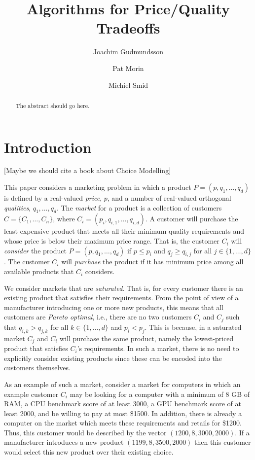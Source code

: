 \documentclass[lotsofwhite]{patmorin}
\title{Algorithms for Price/Quality Tradeoffs}
\author{Joachim Gudmundsson%
	\and Pat Morin%
	\and Michiel Smid}
\begin{document}
\maketitle

\begin{abstract}
The abstract should go here.
\end{abstract}

\section{Introduction}

[Maybe we should cite a book about Choice Modelling]

This paper considers a marketing problem in which a product
$P=(p,q_1,\ldots,q_d)$ is defined by a real-valued \emph{price}, $p$,
and a number of real-valued orthogonal \emph{qualities},
$q_1,\ldots,q_d$.  The \emph{market} for a product is a collection of
customers $C=\{C_1,\ldots,C_n\}$, where
$C_i=(p_i,q_{i,1},\ldots,q_{i,d})$.  A customer will purchase the
least expensive product that meets all their minimum quality
requirements and whose price is below their maximum price range.  That
is, the customer $C_i$ will \emph{consider} the product
$P=(p,q_1,\ldots,q_d)$ if $p \le p_i$ and $q_j \ge q_{i,j}$ for all
$j\in\{1,\ldots,d\}$.  The customer $C_i$ will \emph{purchase} the
product if it has minimum price among all available products that
$C_i$ considers.

We consider markets that are \emph{saturated}.  That is, for every
customer there is an existing product that satisfies their
requirements. From the point of view of a manufacturer introducing one
or more new products, this means that all customers are \emph{Pareto
optimal}, i.e., there are no two customers $C_i$ and $C_j$ such that
$q_{i,k} > q_{j,k}$ for all $k\in\{1,\ldots,d\}$ and $p_i < p_j$.
This is because, in a saturated market $C_j$ and $C_i$ will purchase
the same product, namely the lowest-priced product that satisfies
$C_i$'s requirements.  In such a market, there is no need to
explicitly consider existing products since these can be encoded into
the customers themselves.

As an example of such a market, consider a market for computers in
which an example customer $C_i$ may be looking for a computer with a
minimum of 8 GB of RAM, a CPU benchmark score of at least 3000, a GPU
benchmark score of at least 2000, and be willing to pay at most
\$1500.  In addition, there is already a computer on the market which
meets these requirements and retails for \$1200.  Thus, this customer
would be described by the vector $(1200,8,3000,2000)$.  If a
manufacturer introduces a new product $(1199,8,3500,2000)$ then this
customer would select this new product over their existing choice.
\end{document}
